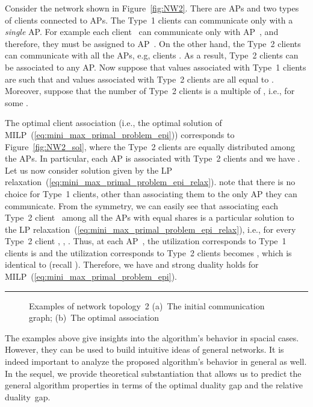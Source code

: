 \documentclass[journal, 10pt, twocolumn]{IEEEtran}
\newenvironment{Ex}
{\begin{adjustwidth}{0.04\linewidth}{0cm}
\begingroup\small
\vspace{-0.10em}
\raisebox{-.20em}{\rule{\linewidth}{0.3pt}}
\begin{example}
}
{
\end{example}
\vspace{-2mm}
\rule{\linewidth}{0.3pt}
\endgroup
\end{adjustwidth}}
\newcommand{\goodgapp}{\hspace{0.1\linewidth}} \newcommand{\goodgap}{\hspace{0.01\linewidth}} \newcommand{\KomM}[2]{{\textbf{{\color{blue!70!black}#1}}}{{\color{red!50!black}#2}}}
\begin{document}
\begin{Ex}\label{ex:network2}
Consider the network shown in Figure~\ref{fig:NW2}. There are  APs and two types of clients connected to APs. The Type~1 clients can communicate only with a \emph{single} AP. For example each client~ can communicate only with AP~, and therefore, they must be assigned to AP~. On the other hand, the Type~2 clients can communicate with all the APs, e.g, clients . As a result, Type~2 clients can be associated to any AP. Now suppose that  values associated with Type~1 clients are such that  and  values associated with Type~2 clients are all equal to . Moreover, suppose that the number of Type~2 clients is a multiple of , i.e.,  for some .

The optimal client association (i.e., the optimal solution of MILP~(\ref{eq:mini_max_primal_problem_epi})) corresponds to Figure~\ref{fig:NW2_sol}, where the Type~2 clients are equally distributed among the APs. In particular, each AP is associated with  Type~2 clients and we have .
Let us now consider solution given by the LP relaxation~(\ref{eq:mini_max_primal_problem_epi_relax}). note that there is no choice for Type~1 clients, other than associating them to the only AP they can communicate. From the symmetry, we can easily see that associating each Type~2 client~ among all the APs  with equal shares is a particular solution to the LP relaxation~(\ref{eq:mini_max_primal_problem_epi_relax}), i.e., for every Type~2 client , , . Thus, at each AP~, the utilization corresponds to Type~1 clients is  and the utilization corresponds to Type~2 clients becomes , which is identical to  (recall ). Therefore, we have  and strong duality holds for MILP~(\ref{eq:mini_max_primal_problem_epi}).
\end{Ex}

\begin{figure}[t]
\centering
{}
\goodgapp
{}\vspace{-2mm}
\caption{Examples of network topology~2 (a)~The initial communication graph; (b)~The optimal association}
\label{fig:NW2_and_sol}
\vspace{-2.0mm}
\end{figure}


The examples above give insights into the algorithm's behavior in spacial cases. However, they can be used to build intuitive ideas of general networks. It is indeed important to analyze the proposed algorithm's behavior in general as well. In the sequel, we provide theoretical substantiation that allows us to predict the general algorithm properties in terms of the optimal duality gap and the relative duality~gap.
\end{document}
